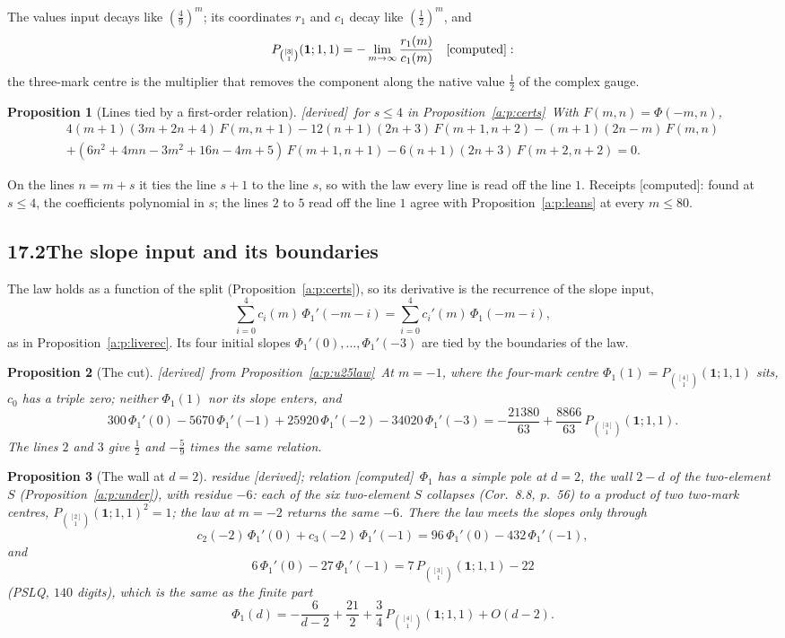 \documentclass[11pt]{article}
\newcommand{\one}{\mathbf 1}
\newcommand{\Pth}{P_{\binom{[3]}1}(\one;1,1)}
\newcommand{\Pfour}{P_{\binom{[4]}1}(\one;1,1)}
\theoremstyle{plain}
\newtheorem{proposition}{Proposition}[section]
\theoremstyle{definition}
\theoremstyle{remark}
\newcommand{\derived}{\textup{[derived]}}
\newcommand{\computed}{\textup{[computed]}}
\begin{document}
The values input decays like $(\frac49)^m$; its coordinates $r_1$ and $c_1$ decay like $(\frac12)^m$, and
\[
\Pth=-\lim_{m\to\infty}\frac{r_1(m)}{c_1(m)}\quad\computed:
\]
the three-mark centre is the multiplier that removes the component along the native value $\frac12$ of the complex gauge.

\begin{proposition}[Lines tied by a first-order relation]\label{a:p:u25mix}\derived\ for $s\le4$ in Proposition~\ref{a:p:certs}\
With $F(m,n)=\Phi(-m,n)$,
\begin{multline*}
4(m+1)(3m+2n+4)\,F(m,n+1)-12(n+1)(2n+3)\,F(m+1,n+2)-(m+1)(2n-m)\,F(m,n)\\
+(6n^2+4mn-3m^2+16n-4m+5)\,F(m+1,n+1)-6(n+1)(2n+3)\,F(m+2,n+2)=0.
\end{multline*}
\end{proposition}

On the lines $n=m+s$ it ties the line $s+1$ to the line $s$, so with the law every line is read off the line $1$. Receipts \computed: found at $s\le4$, the coefficients polynomial in $s$; the lines $2$ to $5$ read off the line $1$ agree with Proposition~\ref{a:p:leans} at every $m\le80$.

\subsection*{17.2\quad The slope input and its boundaries}

The law holds as a function of the split (Proposition~\ref{a:p:certs}), so its derivative is the recurrence of the slope input,
\[
\sum_{i=0}^4c_i(m)\,\Phi_1'(-m-i)=\sum_{i=0}^4c_i'(m)\,\Phi_1(-m-i),
\]
as in Proposition~\ref{a:p:liverec}. Its four initial slopes $\Phi_1'(0),\dots,\Phi_1'(-3)$ are tied by the boundaries of the law.

\begin{proposition}[The cut]\label{a:p:u25cut}\derived\ from Proposition~\ref{a:p:u25law}\
At $m=-1$, where the four-mark centre $\Phi_1(1)=\Pfour$ sits, $c_0$ has a triple zero; neither $\Phi_1(1)$ nor its slope enters, and
\[
300\,\Phi_1'(0)-5670\,\Phi_1'(-1)+25920\,\Phi_1'(-2)-34020\,\Phi_1'(-3)=-\frac{21380}{63}+\frac{8866}{63}\,\Pth .
\]
The lines $2$ and $3$ give $\frac12$ and $-\frac59$ times the same relation.
\end{proposition}

\begin{proposition}[The wall at $d=2$]\label{a:p:u25wall}residue \derived; relation \computed\
$\Phi_1$ has a simple pole at $d=2$, the wall $2-d$ of the two-element $S$ (Proposition~\ref{a:p:under}), with residue $-6$: each of the six two-element $S$ collapses (Cor.~8.8, p.~56) to a product of two two-mark centres, $P_{\binom{[2]}1}(\one;1,1)^2=1$; the law at $m=-2$ returns the same $-6$. There the law meets the slopes only through
\[
c_2(-2)\,\Phi_1'(0)+c_3(-2)\,\Phi_1'(-1)=96\,\Phi_1'(0)-432\,\Phi_1'(-1),
\]
and
\[
6\,\Phi_1'(0)-27\,\Phi_1'(-1)=7\,\Pth-22
\]
(PSLQ, $140$ digits), which is the same as the finite part
\[
\Phi_1(d)=-\frac{6}{d-2}+\frac{21}2+\frac34\,\Pfour+O(d-2).
\]
\end{proposition}
\end{document}
